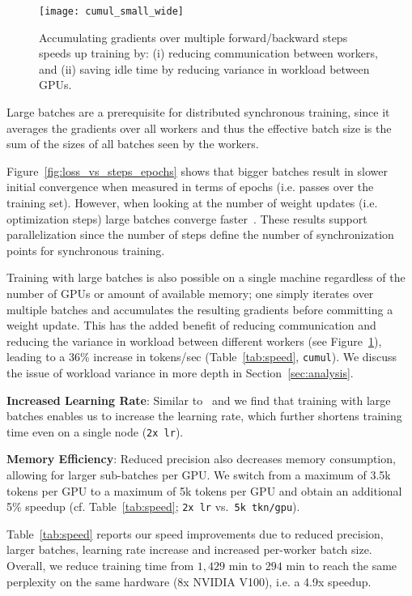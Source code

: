\documentclass[11pt,a4paper]{article}
\begin{document}
\begin{figure}
\begin{center}
\texttt{[image: cumul\_small\_wide]}
\end{center}
\caption{Accumulating gradients over multiple forward/backward steps speeds up training by: (i) reducing communication between workers, and (ii) saving idle time by reducing variance in workload between GPUs.}
\label{fig:cumul}
\end{figure}

Large batches are a prerequisite for distributed synchronous training, since it averages the gradients over all workers and thus the effective batch size is the sum of the sizes of all batches seen by the workers.

Figure~\ref{fig:loss_vs_steps_epochs} shows that bigger batches result in slower initial convergence when measured in terms of epochs (i.e. passes over the training set). However, when looking at the number of weight updates (i.e. optimization steps) large batches converge faster~\citep{hoffer2017train}. These results support parallelization since the number of steps define the number of synchronization points for synchronous training.

Training with large batches is also possible on a single machine regardless of the number of GPUs or amount of available memory; one simply iterates over multiple batches and accumulates the resulting gradients before committing a weight update.
This has the added benefit of reducing communication and reducing the variance in workload between different workers (see Figure~\ref{fig:cumul}), leading to a 36\% increase in tokens/sec (Table~\ref{tab:speed}, \texttt{cumul}).
We discuss the issue of workload variance in more depth in Section~\ref{sec:analysis}.

\textbf{Increased Learning Rate}: Similar to~\citet{goyal2017cvpr} and \citet{smith2017lrbsz} we find that training with large batches enables us to increase the learning rate, which further shortens training time even on a single node (\texttt{2x lr}).

\textbf{Memory Efficiency}: Reduced precision also decreases
memory consumption, allowing for larger sub-batches per GPU.
We switch from a maximum of 3.5k tokens per GPU to a maximum of 5k tokens per GPU and obtain an additional 5\% speedup (cf. Table~\ref{tab:speed}; \texttt{2x lr} vs.~\texttt{5k tkn/gpu}).

Table~\ref{tab:speed} reports our speed improvements due to reduced precision, larger batches, learning rate increase and increased per-worker batch size.
Overall, we reduce training time from $1,429$ min to $294$ min to reach the same perplexity on the same hardware (8x NVIDIA V100), i.e. a 4.9x speedup.
\end{document}
